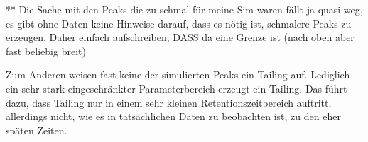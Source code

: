 ** Die Sache mit den Peaks die zu schmal für meine Sim waren fällt ja quasi weg, es gibt ohne Daten keine Hinweise darauf, dass es nötig ist, schmalere Peaks zu erzeugen. Daher einfach aufschreiben, DASS da eine Grenze ist (nach oben aber fast beliebig breit)

Zum Anderen weisen fast keine der simulierten Peaks ein Tailing auf. Lediglich ein sehr stark eingeschränkter Parameterbereich erzeugt ein Tailing. Das führt dazu, dass Tailing nur in einem sehr kleinen Retentionszeitbereich auftritt, allerdings nicht, wie es in tatsächlichen Daten zu beobachten ist, zu den eher späten Zeiten.

